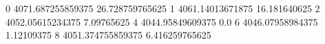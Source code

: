 0 4071.687255859375 26.728759765625
1 4061.14013671875 16.181640625
2 4052.05615234375 7.09765625
4 4044.95849609375 0.0
6 4046.07958984375 1.12109375
8 4051.374755859375 6.416259765625
